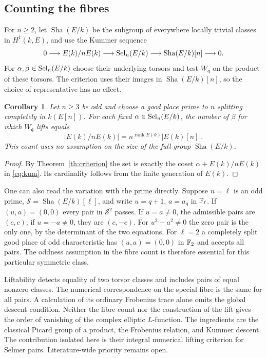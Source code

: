 \documentclass[11pt]{article}
\newcommand{\Sha}{\mathop{\mathrm{Sha}}\nolimits}
\newtheorem{piccorollary}[picproposition]{Corollary}
\begin{document}
\subsection{Counting the fibres}

For $n\ge2$, let $\Sha(E/k)$ be the subgroup of everywhere locally
trivial classes in $H^1(k,E)$, and use the Kummer sequence
\begin{equation}\label{eq:kum}
 0\longrightarrow E(k)/nE(k)
 \longrightarrow\Sel_n(E/k)\longrightarrow\Sha(E/k)[n]
 \longrightarrow0 .
\end{equation}
For $\alpha,\beta\in\operatorname{Sel}_n(E/k)$ choose their underlying torsors and
test $W_{\mathfrak q}$ on the product of these torsors. The criterion
uses their images in $\Sha(E/k)[n]$, so the choice of representative
has no effect.

\begin{piccorollary}
Let $n\ge3$ be odd and choose a good place prime to $n$ splitting
completely in $k(E[n])$. For each fixed $\alpha\in\operatorname{Sel}_n(E/k)$, the
number of $\beta$ for which $W_{\mathfrak q}$ lifts equals
\[
              |E(k)/nE(k)|=n^{\operatorname{rank}E(k)}|E(k)[n]|.
\]
This count uses no assumption on the size of the full group $\Sha(E/k)$.
\end{piccorollary}

\begin{proof}
By Theorem~\ref{th:criterion} the set is exactly the coset
$\alpha+E(k)/nE(k)$ in \eqref{eq:kum}. Its cardinality follows from the
finite generation of $E(k)$.
\end{proof}

One can also read the variation with the prime directly. Suppose
$n=\ell$ is an odd prime, $\mathcal S=\Sha(E/k)[\ell]$, and write
$u=q+1$, $a=a_{\mathfrak q}$ in $\mathbb F_\ell$. If $(u,a)=(0,0)$ every
pair in $\mathcal S^2$ passes. If $u=a\ne0$, the admissible pairs
are $(c,c)$; if $u=-a\ne0$, they are $(c,-c)$. For
$u^2-a^2\ne0$ the zero pair is the only one, by the determinant of the
two equations. For $\ell=2$ a completely split good place of odd
characteristic has $(u,a)=(0,0)$ in $\mathbb F_2$ and accepts all pairs.
The oddness assumption in the fibre count is therefore essential for
this particular symmetric class.

Liftability detects equality of two torsor classes and includes pairs
of equal nonzero classes. The numerical correspondence on the special
fibre is the same for all pairs. A calculation of its ordinary Frobenius
trace alone omits the global descent condition. Neither the fibre count
nor the construction of the lift gives the order of vanishing of the
complex elliptic $L$-function. The ingredients are the classical Picard
group of a product, the Frobenius relation, and Kummer descent. The
contribution isolated here is their integral numerical lifting criterion
for Selmer pairs. Literature-wide priority remains open.
\end{document}
